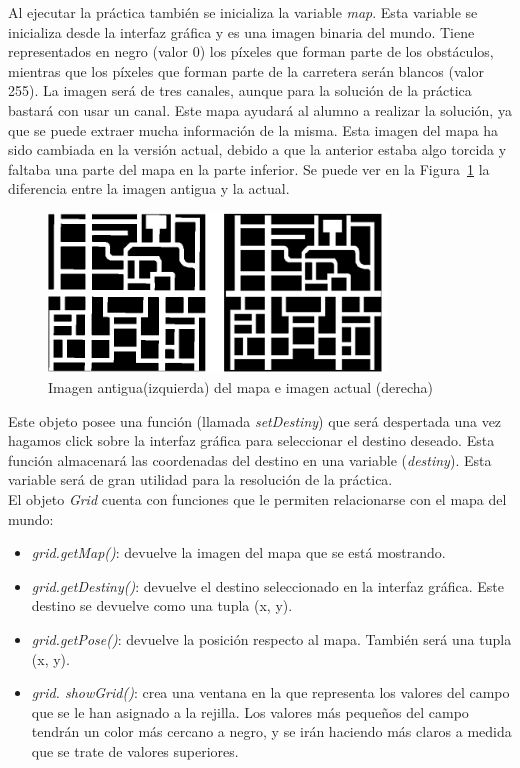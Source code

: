 Al ejecutar la práctica también se inicializa la variable \textit{map}. Esta variable se inicializa desde la interfaz gráfica y es una imagen binaria del mundo. Tiene representados en negro (valor 0) los píxeles que forman parte de los obstáculos, mientras que los píxeles que forman parte de la carretera serán blancos (valor 255). La imagen será de tres canales, aunque para la solución de la práctica bastará con usar un canal. Este mapa ayudará al alumno a realizar la solución, ya que se puede extraer mucha información de la misma. Esta imagen del mapa ha sido cambiada en la versión actual, debido a que la anterior estaba algo torcida y faltaba una parte del mapa en la parte inferior. Se puede ver en la Figura~\ref{fig.imag_mapa} la diferencia entre la imagen antigua y la actual.

\begin{figure}[H]
  \begin{center}
    \includegraphics[width=0.8\textwidth]{figures/GPP/imagenes_Mapa.png}
		\caption{Imagen antigua(izquierda) del mapa e imagen actual (derecha)}
		\label{fig.imag_mapa}
		\end{center}
\end{figure}

Este objeto posee una función (llamada \textit{setDestiny}) que será despertada una vez hagamos click sobre la interfaz gráfica para seleccionar el destino deseado. Esta función almacenará las coordenadas del destino en una variable (\textit{destiny}). Esta variable será de gran utilidad para la resolución de la práctica.\\

El objeto \textit{Grid} cuenta con funciones que le permiten relacionarse con el mapa del mundo:

\begin{itemize}
\item \textit{grid.getMap()}: devuelve la imagen del mapa que se está mostrando.
\item \textit{grid.getDestiny()}: devuelve el destino seleccionado en la interfaz gráfica. Este destino se devuelve como una tupla (x, y).
\item	\textit{grid.getPose()}: devuelve la posición respecto al mapa. También será una tupla (x, y).
\item	\textit{grid. showGrid()}: crea una ventana en la que representa los valores del campo que se le han asignado a la rejilla. Los valores más pequeños del campo tendrán un color más cercano a negro, y se irán haciendo más claros a medida que se trate de valores superiores. 
 
\end{itemize}

